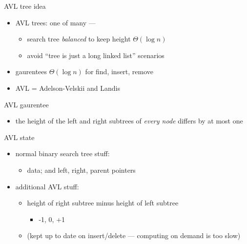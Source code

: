 \usetikzlibrary{graphs,graphdrawing}


\begin{frame}{AVL tree idea}
\begin{itemize}
\item AVL trees: one of many  ---
    \begin{itemize}
    \item search tree \textit{balanced} to keep height $\Theta(\log n)$
    \item avoid ``tree is just a long linked list'' scenarios
    \end{itemize}
\item gaurentees $\Theta(\log n)$ for find, insert, remove
\item AVL = Adelson-Velskii and Landis
\end{itemize}
\end{frame}

\begin{frame}{AVL gaurentee}
\begin{itemize}
\item the height of the left and right subtrees of \textit{every node} differs by at most one
\end{itemize}
\end{frame}

\begin{frame}{AVL state}
\begin{itemize}
\item normal binary search tree stuff:
\begin{itemize}
    \item data; and left, right, parent pointers
\end{itemize}
\item additional AVL stuff:
\begin{itemize}
    \item height of right subtree minus height of left subtree
        \begin{itemize}
        \item -1, 0, +1
        \end{itemize}
    \item (kept up to date  on insert/delete --- computing on demand is too slow)
    \end{itemize}
\end{itemize}
\end{frame}

